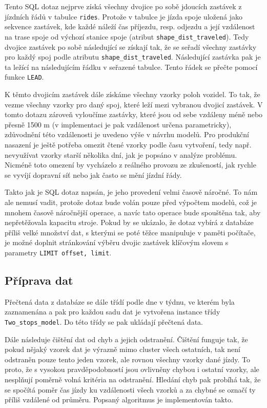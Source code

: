 Tento SQL dotaz nejprve získá všechny dvojice po sobě jdoucích zastávek z jízdních řádů v tabulce \verb-rides-. Protože v tabulce je jízda spoje uložená jako sekvence zastávek, kde každé náleží čas příjezdu, resp. odjezdu a její vzdálenost na trase spoje od výchozí stanice spoje (atribut \verb-shape_dist_traveled-). Tedy dvojice zastávek po sobě následující se získají tak, že se seřadí všechny zastávky pro každý spoj podle atributu \verb-shape_dist_traveled-. Následující zastávka pak je ta ležící na následujícím řádku v seřazené tabulce. Tento řádek se přečte pomocí funkce \verb-LEAD-.


\bigbreak


K těmto dvojicím zastávek dále získáme všechny vzorky poloh vozidel. To tak, že vezme všechny vzorky pro daný spoj, které leží mezi vybranou dvojicí zastávek. V tomto dotazu zároveň vyloučíme zastávky, které jsou od sebe vzdáleny méně nebo přesně 1500 m (v implementaci je pak vzdálenost určena parametricky), zdůvodnění této vzdálenosti je uvedeno výše v návrhu modelů. Pro produkční nasazení je ještě potřeba omezit čtené vzorky podle času vytvoření, tedy např. nevyužívat vzorky starší několika dní, jak je popsáno v analýze problému. Nicméně toto omezení by vycházelo z reálného provozu ze zkušeností, jak rychle se vyvíjí dopravní síť nebo jak často se mění jízdní řády.


\bigbreak


Takto jak je SQL dotaz napsán, je jeho provedení velmi časově náročné. To nám ale nemusí vadit, protože dotaz bude volán pouze před výpočtem modelů, což je mnohem časově náročnější operace, a navíc tato operace bude spouštěna tak, aby nepřetěžovala kapacitu stroje. Pokud by se ukázalo, že dotaz vybírá z databáze příliš velké množství dat, s kterými se poté těžce manipuluje v paměti počítače, je možné doplnit stránkování výběru dvojic zastávek klíčovým slovem s parametry \verb-LIMIT offset, limit-.


\subsection{Příprava dat}


Přečtená data z databáze se dále třídí podle dne v týdnu, ve kterém byla zaznamenána a pak pro každou sadu dat je vytvořena instance třídy \verb-Two_stops_model-. Do této třídy se pak ukládají přečtená data.


\bigbreak


Dále následuje čištění dat od chyb a jejich odstranění. Čištění funguje tak, že pokud nějaký vzorek dat je výrazně mimo cluster všech ostatních, tak není odstraněn pouze tento jeden vzorek, ale rovnou všechny vzorky dané jízdy. To proto, že s vysokou pravděpodobností jsou ovlivněny chybou i ostatní vzorky, ale nesplňují poměrně volná kritéria na odstranění. Hledání chyb pak probíhá tak, že se spočítá poměr čas jízdy ku vzdálenosti všech vzorků a za chybné se označí ty příliš vzdálené od průměru. Popsaný algoritmus je implementován takto.




